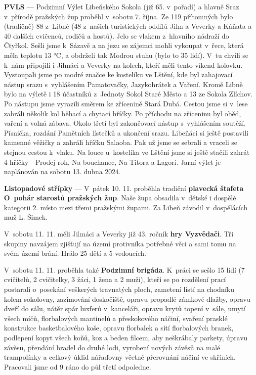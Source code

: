 \documentclass[11pt]{article}
\begin{document}
\vspace*{12pt}
\noindent
\textbf{PVLS} --- Podzimní Výlet Libeňského Sokola (již 65. v~pořadí) a hlavně Sraz v~přírodě pražských žup proběhl v~sobotu 7. října. Ze 119 přítomných bylo (tradičně) 88 z~Libně (48 z~našich turistických oddílů Jilm a Veverky a Káňata a 40 dalších cvičenců, rodičů a hostů). Jelo se vlakem z~hlavního nádraží do Čtyřkol. Sešli jsme k~Sázavě a na jezu se zájemci mohli vykoupat v~řece, která měla teplotu 13 °C, a obdrželi tak Modrou stuhu (bylo to 35 lidí). V~tu chvíli se k~nám připojili i Jilmáci a Veverky na kolech, kteří měli tento víkend kolovku. Vystoupali jsme po modré značce ke kostelíku ve Lštění, kde byl zahajovací nástup srazu s~vyhlášením Pamatovačky, Jazykohrátek a Vaření. Kromě Libně bylo na výletě i 18 účastníků z~Jednoty Sokol Staré Město a 13 ze Sokola Zlíchov. Po nástupu jsme vyrazili směrem ke zřícenině Stará Dubá. Cestou jsme si v~lese zahráli několik kol běhací a chytací hříčky. Po příchodu na zříceninu byl oběd, vaření a volná zábava. Okolo třetí byl zakončovací nástup s~vyhlášením soutěží, Písnička, rozdání Pamětních lístečků a ukončení srazu. Libeňáci si ještě postavili kamenné věžičky a zahráli hříčku Salaoba. Pak už jsme se sebrali a vraceli se stejnou cestou k~vlaku. Na louce u~kostelíka ve Lštění jsme si ještě stačili zahrát 4 hříčky - Prodej roh, Na bouchanec, Na Titora a Lagori. Jarní výlet je naplánován na sobotu 13. dubna 2024.

\vspace*{12pt}
\noindent
\textbf{Listopadové střípky} --- V~pátek 10. 11. proběhla tradiční \textbf{plavecká štafeta O~pohár starostů pražských žup}. Naše župa obsadila v~dětské i dospělé kategorii 2. místo mezi třemi pražskými župami. Za Libeň závodil v~dospělácích muž L. Šimek. 

V~sobotu 11. 11. měli Jilmáci a Veverky již 43. ročník \textbf{hry Vyzvědači}. Tři skupiny navzájem zjišťují na území protivníka potřebné věci a sami tomu na svém území brání. Hrálo 25 dětí a 5 vedoucích.

V~sobotu 11. 11. proběhla také \textbf{Podzimní brigáda}. K~práci se sešlo 15 lidí (7 cvičitelů, 2 cvičitelky, 3 žáci, 1 žena a 2 muži), kteří se po rozdělení prací postarali o~posekání veškerých travnatých ploch, zametení listí na chodníku kolem sokolovny, zazimování doskočiště, opravu propadlé zámkové dlažby, opravu dveří do sálu, nátěr spár luxferů v~kanceláři, opravu krytů topení v~sále, umytí všech míčů, florbalových mantinelů a přeskokového náčiní, svaření prasklé konstrukce basketbalového koše, opravu florbalek a sítí florbalových branek, podlepení kopyt všech koňů, koz a beden filcem, aby neškrábaly parkety, úpravu závěsu, přendání bradel do druhé lodi, vyrobení nových závěsů na malé trampolínky a celkový úklid nářaďovny včetně přerovnání náčiní ve skříních. Pracovali jsme od 9 ráno do půl třetí odpoledne.
\end{document}
